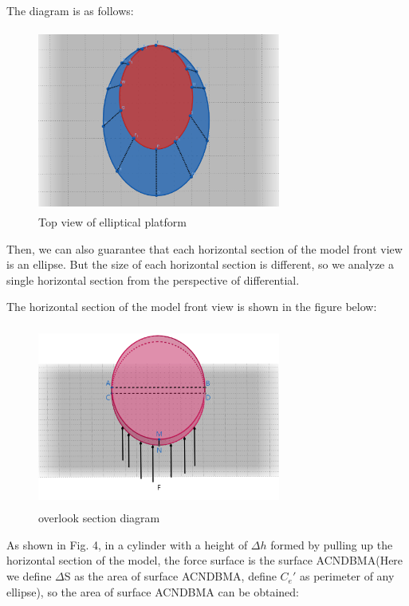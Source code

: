 \documentclass[13pt]{ctexart}
\begin{document}
	The diagram is as follows:
	
	\begin {figure}[htb]
	\centering %
	\includegraphics[width=8cm,height=6cm]{Top_v2.png}
	\caption{Top view of elliptical platform} %
	\label{spread_rate}
	\end {figure}
	
	Then, we can also guarantee that each horizontal section of the model front view is an ellipse. But the size of each horizontal section is different, so we analyze a single horizontal section from the perspective of differential.
	
	
	The horizontal section of the model front view is shown in the figure below:
	
	\begin {figure}[htb]
	\centering %
	\includegraphics[width=8cm,height=6cm]{overlook_sd.png}
	\caption{overlook section diagram} %
	\label{spread_rate}
	\end {figure}
	
	As shown in Fig. 4, in a cylinder with a height of ${\Delta}h$ formed by pulling up the horizontal section of the model, the force surface is the surface ACNDBMA(Here we define $\Delta$S as the area of surface ACNDBMA, define ${C_e}'$ as perimeter of any ellipse), so the area of surface ACNDBMA can be obtained:
	
\end{document}
